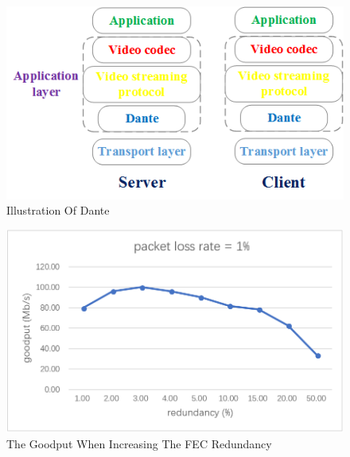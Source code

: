 \begin{figure}[ht]
	\centering
	\includegraphics[scale=0.4]{paper_figs/stack_dante.png}
	\caption{Illustration Of Dante}
	\label{paper_figs:pathdemo}
\end{figure}

\begin{figure}[ht]
	\centering
	\includegraphics[scale=0.25]{paper_figs/tradeoff_only_goodput.png}
	\caption{The Goodput When Increasing The FEC Redundancy}
	\label{paper_figs:pathdemo}
\end{figure}

